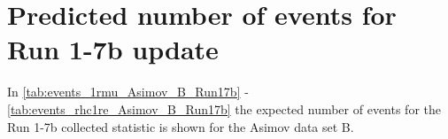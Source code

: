 
%
%

\section{Predicted number of events for Run 1-7b update}
\label{app:events_run17b}

In \cref{tab:events_1rmu_Asimov_B_Run17b} - \ref{tab:events_rhc1re_Asimov_B_Run17b} 
the expected number of events for the Run 1-7b collected statistic is shown for the Asimov data set B.






\clearpage




